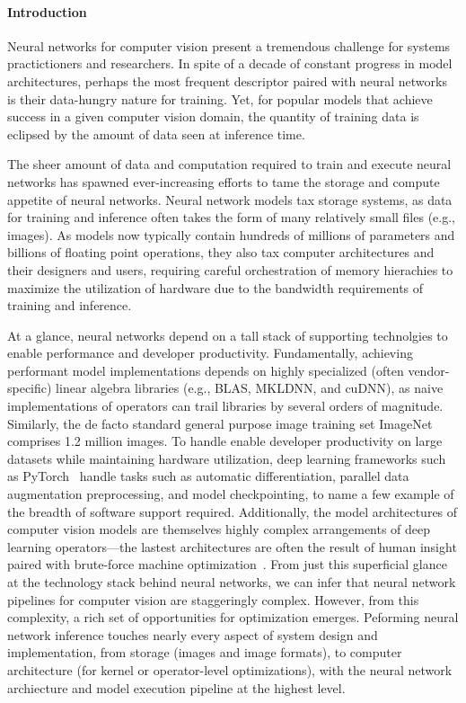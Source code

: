 \paragraph{Introduction}
Neural networks for computer vision present a tremendous challenge for systems practictioners and researchers.
In spite of a decade of constant progress in model architectures, perhaps the most frequent descriptor paired with neural networks is their data-hungry nature for training.
Yet, for popular models that achieve success in a given computer vision domain, the quantity of training data is eclipsed by the amount of data seen at inference time.

The sheer amount of data and computation required to train and execute neural networks has spawned ever-increasing efforts to tame the storage and compute appetite of neural networks.
Neural network models tax storage systems, as data for training and inference often takes the form of many relatively small files (e.g., images).
As models now typically contain hundreds of millions of parameters and billions of floating point operations, they also tax computer architectures and their designers and users, requiring careful orchestration of memory hierachies to maximize the utilization of hardware due to the bandwidth requirements of training and inference.

At a glance, neural networks depend on a tall stack of supporting technolgies to enable performance and developer productivity.
Fundamentally, achieving performant model implementations depends on highly specialized (often vendor-specific) linear algebra libraries (e.g., BLAS, MKLDNN, and cuDNN), as naive implementations of operators can trail libraries by several orders of magnitude.
Similarly, the de facto standard general purpose image training set ImageNet~\cite{russakovsky2015imagenet} comprises 1.2 million images.
To handle enable developer productivity on large datasets while maintaining hardware utilization, deep learning frameworks such as PyTorch~\cite{paszke2019pytorch} handle tasks such as automatic differentiation, parallel data augmentation preprocessing, and model checkpointing, to name a few example of the breadth of software support required.
Additionally, the model architectures of computer vision models are themselves highly complex arrangements of deep learning operators---the lastest architectures are often the result of human insight paired with brute-force machine optimization~\cite{tan2019efficientnet, real2019regularized, liu2018darts}.
From just this superficial glance at the technology stack behind neural networks, we can infer that neural network pipelines for computer vision are staggeringly complex.
However, from this complexity, a rich set of opportunities for optimization emerges.
Peforming neural network inference touches nearly every aspect of system design and implementation, from storage (images and image formats), to computer architecture (for kernel or operator-level optimizations), with the neural network archiecture and model execution pipeline at the highest level.


